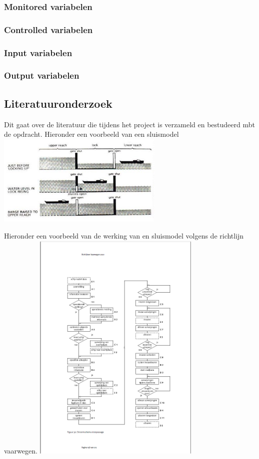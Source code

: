 \documentclass{article}
\begin{document}
	\subsubsection{Monitored variabelen}
	\subsubsection{Controlled variabelen}
	\subsubsection{Input variabelen}
	\subsubsection{Output variabelen}
	
	
	\subsection{Literatuuronderzoek}
	Dit gaat over de literatuur die tijdens het project is verzameld en bestudeerd mbt de opdracht.
	Hieronder een voorbeeld van een sluismodel
	\includegraphics[width=8cm]{sluismodel.jpg} %
	
		Hieronder een voorbeeld van de werking van en sluismodel volgens de richtlijn vaarwegen.
	\includegraphics[width=8cm]{sluispassage.png} %
	
\end{document}
